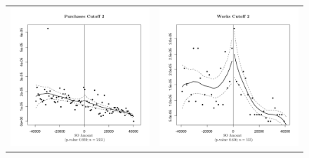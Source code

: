 \documentclass[11pt]{article}
\begin{document}
\begin{figure}[!htbp]
\begin{tabular}{cc}
  \includegraphics[scale=.41]{purchasesmanipulation2} & \includegraphics[scale=.41]{worksmanipulation2} \\

\end{tabular}
\end{figure}
\end{document}
